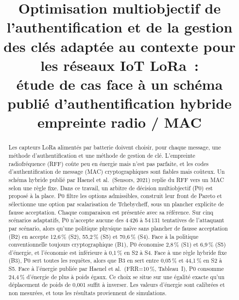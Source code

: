 \documentclass[conference]{IEEEtran}
\begin{document}
\title{Optimisation multiobjectif de l'authentification et de la gestion des clés adaptée au contexte pour les réseaux IoT LoRa~:\\
étude de cas face à un schéma publié d'authentification hybride empreinte radio / MAC}

\author{
\and
{}
\and
{}
}

\maketitle

\begin{abstract}
Les capteurs LoRa alimentés par batterie doivent choisir, pour chaque message, une méthode d'authentification et une méthode de gestion de clé. L'empreinte radiofréquence (RFF) coûte peu en énergie mais n'est pas parfaite, et les codes d'authentification de message (MAC) cryptographiques sont fiables mais coûteux. Un schéma hybride publié par Haenel et al.\ (Sensors, 2021) replie du RFF vers un MAC selon une règle fixe. Dans ce travail, un arbitre de décision multiobjectif (P0) est proposé à la place. P0 filtre les options admissibles, construit leur front de Pareto et sélectionne une option par scalarisation de Tchebycheff, sous un plancher explicite de fausse acceptation. Chaque comparaison est présentée avec sa référence. Sur cinq scénarios adaptatifs, P0 n'accepte aucune des 4\,426 à 54\,131 tentatives de l'attaquant par scénario, alors qu'une politique physique naïve sans plancher de fausse acceptation (B2) en accepte 12,6\,\% (S2), 55,2\,\% (S5) et 70,6\,\% (S4). Face à la politique conventionnelle toujours cryptographique (B1), P0 économise 2,8\,\% (S1) et 6,9\,\% (S5) d'énergie, et l'économie est inférieure à 0,1\,\% en S2 à S4. Face à une règle hybride fixe (B3), P0 sert toutes les requêtes, alors que B3 en sert entre 0,05\,\% et 44,1\,\% en S2 à S5. Face à l'énergie publiée par Haenel et al.\ (FRR=10\,\%, Tableau~I), P0 consomme 24,4\,\% d'énergie de plus à poids égaux. Ce choix se situe sur une égalité exacte qu'un déplacement de poids de 0,001 suffit à inverser. Les valeurs d'énergie sont calibrées et non mesurées, et tous les résultats proviennent de simulations.
\end{abstract}
\end{document}
